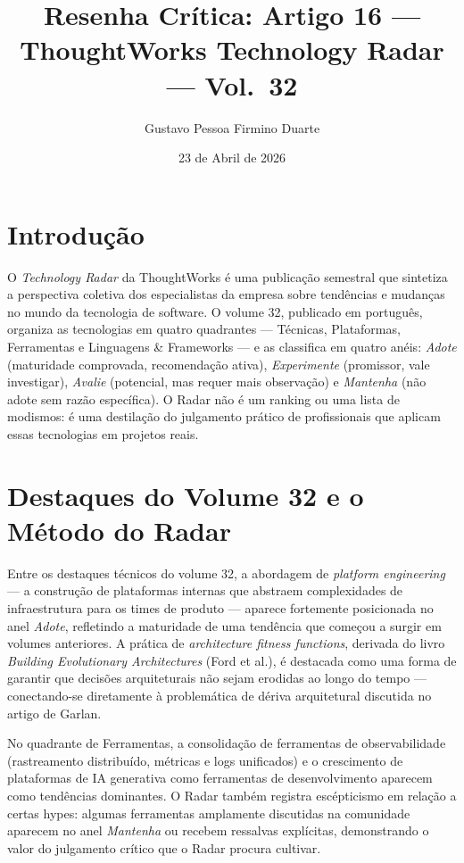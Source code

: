 \documentclass[12pt,a4paper]{article}
\title{Resenha Cr\'itica: Artigo 16 ---\\
ThoughtWorks Technology Radar --- Vol.\ 32}
\author{Gustavo Pessoa Firmino Duarte}
\date{23 de Abril de 2026}
\begin{document}
\maketitle

\section{Introdu\c{c}\~ao}

O \textit{Technology Radar} da ThoughtWorks \'e uma publica\c{c}\~ao semestral
que sintetiza a perspectiva coletiva dos especialistas da empresa sobre tend\^encias
e mudan\c{c}as no mundo da tecnologia de software. O volume 32, publicado em
portugu\^es, organiza as tecnologias em quatro quadrantes --- T\'ecnicas,
Plataformas, Ferramentas e Linguagens \& Frameworks --- e as classifica em quatro
an\'eis: \textit{Adote} (maturidade comprovada, recomenda\c{c}\~ao ativa),
\textit{Experimente} (promissor, vale investigar), \textit{Avalie} (potencial,
mas requer mais observa\c{c}\~ao) e \textit{Mantenha} (n\~ao adote sem raz\~ao
espec\'ifica). O Radar n\~ao \'e um ranking ou uma lista de modismos: \'e uma
destila\c{c}\~ao do julgamento pr\'atico de profissionais que aplicam essas
tecnologias em projetos reais.

\section{Destaques do Volume 32 e o M\'etodo do Radar}

Entre os destaques t\'ecnicos do volume 32, a abordagem de \textit{platform
engineering} --- a constru\c{c}\~ao de plataformas internas que abstraem
complexidades de infraestrutura para os times de produto --- aparece fortemente
posicionada no anel \textit{Adote}, refletindo a maturidade de uma tend\^encia
que come\c{c}ou a surgir em volumes anteriores. A pr\'atica de \textit{architecture
fitness functions}, derivada do livro \textit{Building Evolutionary Architectures}
(Ford et al.), \'e destacada como uma forma de garantir que decis\~oes arquiteturais
n\~ao sejam erodidas ao longo do tempo --- conectando-se diretamente \`a
problem\'atica de d\'eriva arquitetural discutida no artigo de Garlan.

No quadrante de Ferramentas, a consolida\c{c}\~ao de ferramentas de observabilidade
(rastreamento distribu\'ido, m\'etricas e logs unificados) e o crescimento de
plataformas de IA generativa como ferramentas de desenvolvimento aparecem como
tend\^encias dominantes. O Radar tamb\'em registra esc\'epticismo em rela\c{c}\~ao
a certas hypes: algumas ferramentas amplamente discutidas na comunidade aparecem
no anel \textit{Mantenha} ou recebem ressalvas expl\'icitas, demonstrando o valor
do julgamento cr\'itico que o Radar procura cultivar.
\end{document}
